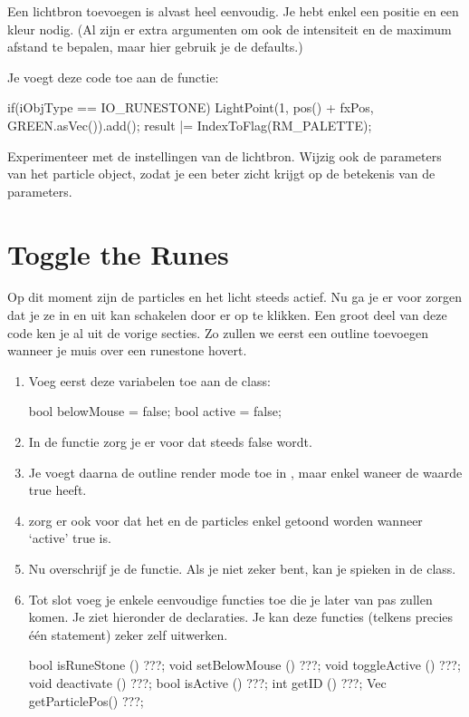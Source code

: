 Een lichtbron toevoegen is alvast heel eenvoudig. Je hebt enkel een positie en een kleur nodig. (Al zijn er extra argumenten om ook de intensiteit en de maximum afstand te bepalen, maar hier gebruik je de defaults.)

Je voegt deze code toe aan de  functie:
\begin{code}
if(iObjType == IO_RUNESTONE)
{
   LightPoint(1, pos() + fxPos, GREEN.asVec()).add();
   result |= IndexToFlag(RM_PALETTE);
}
\end{code}

\begin{exercise}
Experimenteer met de instellingen van de lichtbron. Wijzig ook de parameters van het particle object, zodat je een beter zicht krijgt op de betekenis van de parameters.
\end{exercise}

\section{Toggle the Runes}
Op dit moment zijn de particles en het licht steeds actief. Nu ga je er voor zorgen dat je ze in en uit kan schakelen door er op te klikken. Een groot deel van deze code ken je al uit de vorige secties. Zo zullen we eerst een outline toevoegen wanneer je muis over een runestone hovert.

\begin{enumerate}
	\item Voeg eerst deze variabelen toe aan de  class:

\begin{code}
bool belowMouse = false;
bool active = false;
\end{code}
	\item In de  functie zorg je er voor dat  steeds false wordt.
	\item Je voegt daarna de outline render mode toe in , maar enkel waneer  de waarde true heeft.
	\item zorg er ook voor dat het  en de particles enkel getoond worden wanneer `active' true is.
	\item Nu overschrijf je de  functie. Als je niet zeker bent, kan je spieken in de  class.
	\item Tot slot voeg je enkele eenvoudige functies toe die je later van pas zullen komen. Je ziet hieronder de declaraties. Je kan deze functies (telkens precies \'e\'en statement) zeker zelf uitwerken.

\begin{code}
   bool isRuneStone   () { ???; }  
   void setBelowMouse () { ???; }  
   void toggleActive  () { ???; }
   void deactivate    () { ???; }
   bool isActive      () { ???; } 
   int  getID         () { ???; }   
   Vec  getParticlePos() { ???; }
\end{code}

\end{enumerate}

